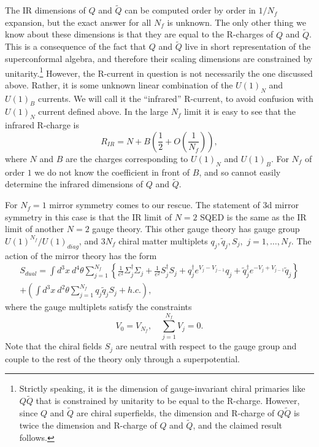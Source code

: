 \documentclass[a4paper,12pt, amsfonts, amssymb]{article}
\newcommand{\tQ}{{\tilde Q}}
\newcommand{\tq}{{\tilde q}}
\begin{document}
The IR dimensions of $Q$ and $\tQ$ can be computed order by order in
$1/N_f$ expansion, but the exact answer for all $N_f$ is unknown. 
The only other thing we know about these dimensions is that they are equal
to the R-charges of $Q$ and $\tQ$. This is a consequence
of the fact that $Q$ and $\tQ$ live in short representation of the superconformal algebra, and therefore their scaling dimensions are 
constrained by unitarity.\footnote{Strictly speaking, it is the dimension 
of gauge-invariant chiral primaries like $Q\tQ$ that is constrained 
by unitarity to be equal to the R-charge. However, since $Q$ and $\tQ$ are chiral superfields, the dimension and R-charge of $Q\tQ$ is twice the dimension and R-charge of $Q$ and $\tQ$, and the claimed result follows.}
However, the R-current in
question is not necessarily the one discussed above. Rather, it is
some unknown linear combination of the $U(1)_N$ and $U(1)_B$ currents. 
We will call it the ``infrared'' R-current, to avoid confusion with 
$U(1)_N$ current defined above. 
In the large $N_f$ limit it is easy to see that the infrared R-charge is
$$
R_{IR}=N+B\left(\frac{1}{2}+O\left(\frac{1}{N_f}\right)\right),
$$
where $N$ and $B$ are the charges corresponding to $U(1)_N$ and $U(1)_B$. 
For $N_f$ of order $1$ we do not know the coefficient in front of $B$, and so cannot easily determine the infrared dimensions of $Q$ and $\tQ$.

For $N_f=1$ mirror symmetry comes to our rescue. The statement of 3d mirror
symmetry in this case is that the IR limit of $N=2$ SQED is the same
as the IR limit of another $N=2$ gauge theory. This other gauge theory
has gauge group $U(1)^{N_f}/U(1)_{diag}$, and $3N_f$ chiral matter multiplets $q_j,\tq_j,S_j,$ $j=1,\ldots,N_f.$ The action of the mirror theory has
the form
\begin{multline*}
S_{dual}=\int d^3x\ d^4\theta \sum_{j=1}^{N_f}\left\{
\frac{1}{e^2}\Sigma_j^\dag\Sigma_j + \frac{1}{e^2} S_j^\dag S_j +
q_j^\dag e^{V_{j}-V_{j-1}} q_j+\tq_j^\dag e^{-V_{j}+V_{j-1}} \tq_j \right\}\\
+\left(\int d^3x\ d^2\theta \sum_{j=1}^{N_f} q_j \tq_j S_j +h.c.\right), 
\end{multline*}
where the gauge multiplets satisfy the constraints
\begin{equation}\label{constr}
V_0=V_{N_f},\quad \sum_{j=1}^{N_f} V_j=0.
\end{equation}
Note that the chiral fields $S_j$ are neutral with respect to the gauge
group and couple to the rest of the theory only through a superpotential.
\end{document}
